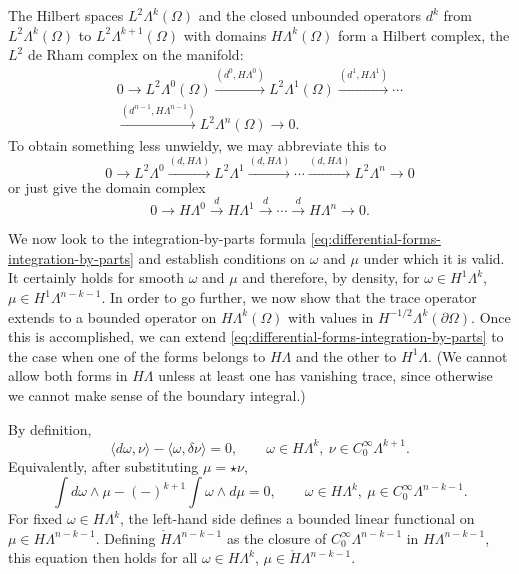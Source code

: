 {The Hilbert spaces $L^2\Lambda^k(\Omega)$ and the closed unbounded operators $d^k$ from $L^2\Lambda^k(\Omega)$ to $L^2\Lambda^{k+1}(\Omega)$ with domains $H\Lambda^k(\Omega)$ form a Hilbert complex, the $L^2$ de Rham complex on the manifold:}
\[
\begin{gathered}
0\to L^2\Lambda^0(\Omega)\xrightarrow{(d^0,H\Lambda^0)}L^2\Lambda^1(\Omega)\xrightarrow{(d^1,H\Lambda^1)}\cdots\\
\xrightarrow{(d^{n-1},H\Lambda^{n-1})}L^2\Lambda^n(\Omega)\to0.
\end{gathered}
\]
{To obtain something less unwieldy, we may abbreviate this to}
\begin{equation}\label{eq:l2-manifold-de-rham-complex}
0\to L^2\Lambda^0\xrightarrow{(d,H\Lambda)}L^2\Lambda^1\xrightarrow{(d,H\Lambda)}\cdots\xrightarrow{(d,H\Lambda)}L^2\Lambda^n\to0
\end{equation}
{or just give the domain complex}
\begin{equation}\label{eq:manifold-de-rham-domain-complex}
0\to H\Lambda^0\xrightarrow{d}H\Lambda^1\xrightarrow{d}\cdots\xrightarrow{d}H\Lambda^n\to0.
\end{equation}

{We now look to the integration-by-parts formula \eqref{eq:differential-forms-integration-by-parts} and establish conditions on $\omega$ and $\mu$ under which it is valid. It certainly holds for smooth $\omega$ and $\mu$ and therefore, by density, for $\omega\in H^1\Lambda^k$, $\mu\in H^1\Lambda^{n-k-1}$. In order to go further, we now show that the trace operator extends to a bounded operator on $H\Lambda^k(\Omega)$ with values in $H^{-1/2}\Lambda^k(\partial\Omega)$. Once this is accomplished, we can extend \eqref{eq:differential-forms-integration-by-parts} to the case when one of the forms belongs to $H\Lambda$ and the other to $H^1\Lambda$. (We cannot allow both forms in $H\Lambda$ unless at least one has vanishing trace, since otherwise we cannot make sense of the boundary integral.)}

{By definition,}
\[
\langle d\omega,\nu\rangle-\langle\omega,\delta\nu\rangle=0,\qquad\omega\in H\Lambda^k,\ \nu\in C_0^\infty\Lambda^{k+1}.
\]
{Equivalently, after substituting $\mu=\star\nu$,}
\[
\int d\omega\wedge\mu-(-)^{k+1}\int\omega\wedge d\mu=0,\qquad\omega\in H\Lambda^k,\ \mu\in C_0^\infty\Lambda^{n-k-1}.
\]
{For fixed $\omega\in H\Lambda^k$, the left-hand side defines a bounded linear functional on $\mu\in H\Lambda^{n-k-1}$. Defining $\mathring H\Lambda^{n-k-1}$ as the closure of $C_0^\infty\Lambda^{n-k-1}$ in $H\Lambda^{n-k-1}$, this equation then holds for all $\omega\in H\Lambda^k$, $\mu\in\mathring H\Lambda^{n-k-1}$.}

